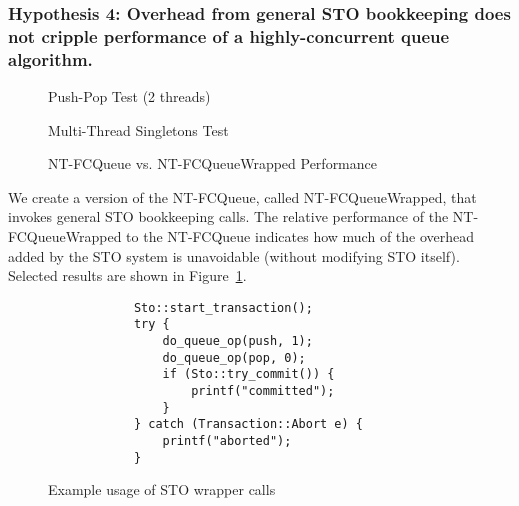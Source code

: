 \vspace{12pt}
\noindent{}

\subsubsection{Hypothesis 4: Overhead from general STO bookkeeping does not cripple performance of a highly-concurrent queue algorithm.}

\begin{figure}[H]
    \centering
	\begin{minipage}{0.75\textwidth}
        \caption*{Push-Pop Test (2 threads)}
        \vspace{12pt}
	\end{minipage}
   	\begin{minipage}{0.75\textwidth}
        \caption*{Multi-Thread Singletons Test}
	\end{minipage}
        \caption{NT-FCQueue vs. NT-FCQueueWrapped Performance}
    \label{fig:wrappedqs}
\end{figure}

We create a version of the NT-FCQueue, called NT-FCQueueWrapped, that invokes general STO bookkeeping calls. The relative performance of the NT-FCQueueWrapped to the NT-FCQueue indicates how much of the overhead added by the STO system is unavoidable (without modifying STO itself). 
Selected results are shown in Figure~\ref{fig:wrappedqs}.

\begin{figure}[H]
\centering
\singlespace
{}
	\begin{lstlisting}
            Sto::start_transaction();
            try {
                do_queue_op(push, 1);
                do_queue_op(pop, 0);
                if (Sto::try_commit()) {
                    printf("committed");
                }
            } catch (Transaction::Abort e) {
                printf("aborted");
            }
	\end{lstlisting}
\caption{Example usage of STO wrapper calls}
\label{fig:wrappers}
\end{figure}

